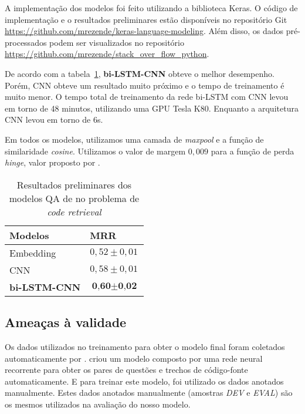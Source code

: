 \documentclass[12pt]{article}
\begin{document}
A implementação dos modelos foi feito utilizando a biblioteca Keras. O código de implementação e o resultados preliminares estão disponíveis no repositório Git \url{https://github.com/mrezende/keras-language-modeling}. Além disso, os dados pré-processados podem ser visualizados no repositório \url{https://github.com/mrezende/stack_over_flow_python}.

De acordo com a tabela~\ref{table:resultados-preliminares}, \textbf{bi-LSTM-CNN} obteve o melhor desempenho. Porém, CNN obteve um resultado muito próximo e o tempo de treinamento é muito menor. O tempo total de treinamento da rede bi-LSTM com CNN levou em torno de 48 minutos, utilizando uma GPU Tesla K80. Enquanto a arquitetura CNN levou em torno de 6s. 

Em todos os modelos, utilizamos uma camada de \textit{maxpool} e a função de similaridade \textit{cosine}. Utilizamos o valor de margem $0,009$ para a função de perda \textit{hinge}, valor proposto por \cite{feng-answer-selection-2015}.


\begin{table}[h]
\centering
\begin{tabular}{ |p{3cm}|p{3cm}|  }
 \hline
 \textbf{Modelos} & \textbf{MRR}\\
 \hline
 Embedding & $0,52 \pm 0,01$\\
 \hline
 CNN & $0,58 \pm 0,01 $ \\
 \hline
 \textbf{bi-LSTM-CNN} & $\textbf{0,60} \pm \textbf{0,02}$\\
 \hline
\end{tabular}
\caption{Resultados preliminares dos modelos QA de \cite{tan-lstm-qa} no problema de \textit{code retrieval}}
\label{table:resultados-preliminares}
\end{table}

\subsection{Ameaças à validade}

Os dados utilizados no treinamento para obter o modelo final foram coletados automaticamente por \cite{Yao-staqc:2018}. \cite{Yao-staqc:2018} criou um modelo composto por uma rede neural recorrente para obter os pares de questões e trechos de código-fonte automaticamente. E para treinar este modelo, foi utilizado os dados anotados manualmente. Estes dados anotados manualmente (amostras \emph{DEV} e \emph{EVAL}) são os mesmos utilizados na avaliação do nosso modelo. 
\end{document}
